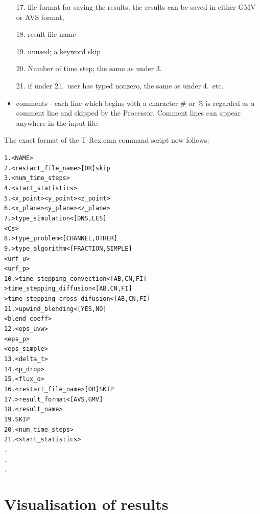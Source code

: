 \documentclass[10pt]{article}
\newcommand*{\tc}{\ttfamily} %
\newcommand*{\tn}{\sffamily} %
\begin{document}
\begin{itemize}
    \item[17.] file format for saving the results; the results
               can be saved in either GMV or AVS format,
    \item[18.] result file name 
    \item[19.] unused; a keyword skip
    \item[20.] Number of time step; the same as under 3.
    \item[21.] if under 21.\ user has typed nonzero, the same as
               under 4.\, etc.         
    \item comments - each line which begins with a character {\tc \#}
          or {\tc \%} is regarded as a comment line and skipped by the
          {\tn Processor}. Comment lines can appear anywhere in the
          input file.
    \end{itemize}
    The exact format of the {\tc T-Rex.cmn} command script now
    follows:
    \small
    \begin{alltt}
     1. <NAME>
     2. <restart_file_name> [OR] skip
     3. <num_time_steps>
     4. <start_statistics>
     5. <x_point> <y_point> <z_point>
     6. <x_plane> <y_plane> <z_plane>
     7. >type_simulation< [DNS,LES]
        <Cs> 
     8. >type_problem<   [CHANNEL,OTHER]
     9. >type_algorithm< [FRACTION,SIMPLE]
        <urf_u>
        <urf_p>
    10. >time_stepping_convection<     [AB,CN,FI]
        >time_stepping_diffusion<      [AB,CN,FI]
        >time_stepping_cross_difusion< [AB,CN,FI]
    11. >upwind_blending<              [YES,NO]
        <blend_coeff>
    12. <eps_uvw>
        <eps_p>
        <eps_simple>
    13. <delta_t>
    14. <p_drop>
    15. <flux_o>
    16. <restart_file_name> [OR] SKIP 
    17. >result_format< [AVS,GMV]
    18. <result_name>
    19. SKIP 
    20. <num_time_steps>
    21. <start_statistics>
        .
        .
        .
    \end{alltt}
    \normalsize

%
    \newpage
    \section{Visualisation of results}
%
\end{document}
